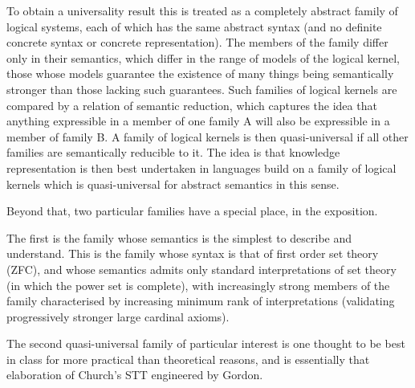 \documentclass[10pt,titlepage]{book}
\begin{document}
To obtain a universality result this is treated as a completely abstract family of logical systems, each of which has the same abstract syntax (and no definite concrete syntax or concrete representation).
The members of the family differ only in their semantics,  which differ in the range of models of the logical kernel,
those whose models guarantee the existence of many things being semantically stronger than those lacking such guarantees.
Such families of logical kernels are compared by a relation of semantic reduction, which captures the idea that anything expressible in a member of one family A will also be expressible in a member of family B.
A family of logical kernels is then quasi-universal if all other families are semantically reducible to it.
The idea is that knowledge representation is then best undertaken in languages build on a family of logical kernels which is quasi-universal for abstract semantics in this sense.

Beyond that, two particular families have a special place, in the exposition.

The first is the family whose semantics is the simplest to describe and understand.
This is the family whose syntax is that of first order set theory (ZFC), and whose semantics admits only standard interpretations of set theory (in which the power set is complete), with increasingly strong members of the family characterised by increasing minimum rank of interpretations (validating progressively stronger large cardinal axioms).

The second quasi-universal family of particular interest is one thought to be best in class for more practical than theoretical reasons, and is essentially that elaboration of Church's STT engineered by Gordon.

\cite{carnap63a,carnap63}
\listoftables




\renewcommand{\indexname}{Index of Defined Terms}
{\twocolumn[]
{\small\printindex}}


\end{document}

